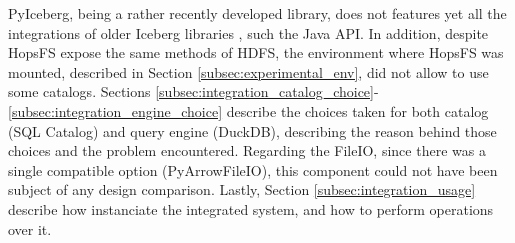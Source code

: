 PyIceberg, being a rather recently developed library, does not features yet all the integrations of older Iceberg libraries \cite{iceberg_tech_docs}, such the Java \gls{API}. In addition, despite \gls{HopsFS} expose the same methods of \gls{HDFS}, the environment where HopsFS was mounted, described in Section \ref{subsec:experimental_env}, did not allow to use some catalogs. Sections \ref{subsec:integration_catalog_choice}-\ref{subsec:integration_engine_choice} describe the choices taken for both catalog (SQL Catalog) and query engine (DuckDB), describing the reason behind those choices and the problem encountered. Regarding the FileIO, since there was a single compatible option (PyArrowFileIO), this component could not have been subject of any design comparison. Lastly, Section \ref{subsec:integration_usage} describe how instanciate the integrated system, and how to perform operations over it.


